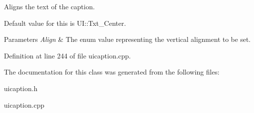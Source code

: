 Aligns the text of the caption. 

Default value for this is UI::Txt\_\-Center. 
\begin{DoxyParams}{Parameters}
{\em Align} & The enum value representing the vertical alignment to be set. \\
\hline
\end{DoxyParams}


Definition at line 244 of file uicaption.cpp.



The documentation for this class was generated from the following files:\begin{DoxyCompactItemize}
\item 
uicaption.h\item 
uicaption.cpp\end{DoxyCompactItemize}
